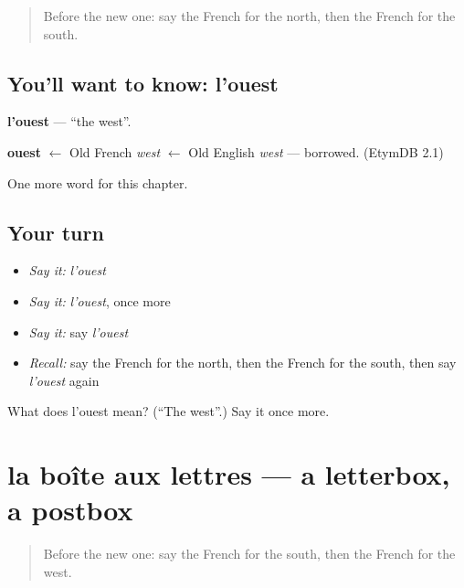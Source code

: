 \label{lesson:FR-C109-ouest}



\begin{quote}
Before the new one: say the French for the north, then the French for the south.
\end{quote}

\subsection*{You'll want to know: l'ouest}
\textbf{l'ouest} — \textquotedblleft{}the west\textquotedblright{}.

\begin{cousinweb}
\textbf{ouest} $\leftarrow$ Old French \emph{west} $\leftarrow$ Old English \emph{west} — borrowed. (EtymDB 2.1)
\end{cousinweb}

\begin{grammarlens}[title={What you've built}]
One more word for this chapter.
\end{grammarlens}

\subsection*{Your turn}
\begin{itemize}
\raggedright
  \item \emph{Say it:} \emph{l'ouest}
  \item \emph{Say it:} \emph{l'ouest}, once more
  \item \emph{Say it:} say \emph{l'ouest}
  \item \emph{Recall:} say the French for the north, then the French for the south, then say \emph{l'ouest} again
\end{itemize}

\begin{tcolorbox}[breakable,colback=teal!4,colframe=teal!35!black,title={Before you move on}]
What does l'ouest mean? (\textquotedblleft{}The west\textquotedblright{}.) Say it once more.
\end{tcolorbox}
\section[la boîte aux lettres]{la boîte aux lettres — a letterbox, a postbox}

\label{lesson:FR-C109-boite-aux-lettres}



\begin{quote}
Before the new one: say the French for the south, then the French for the west.
\end{quote}

